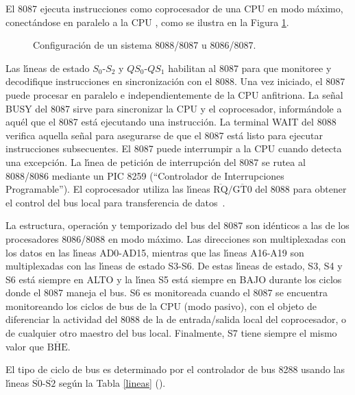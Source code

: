 El 8087 ejecuta instrucciones como coprocesador de una CPU en modo m\'aximo, conect\'andose en %
paralelo a la CPU \cite{Intel:Micro}, como se ilustra en la Figura \ref{fig:conexion}.

\vspace{5mm}

\begin{figure}[!htb]
\vskip 10mm
\vskip 80mm
\caption{Configuraci\'on de un sistema 8088/8087 u 8086/8087.}
\label{fig:conexion}
\end{figure}

Las l\'{\i}neas de estado $S_{0}$-$S_{2}$ y $QS_{0}$-$QS_{1}$ habilitan al 8087 para que %
mo\-ni\-to\-ree y decodifique instrucciones en sincronizaci\'on con el 8088. Una vez iniciado, %
el 8087 puede procesar en paralelo e independientemente de la CPU anfitriona. La se\~nal BUSY %
del 8087 sirve para sincronizar la CPU y el coprocesador, inform\'andole a aqu\'el que el 8087 %
est\'a ejecutando una instrucci\'on. La terminal WAIT del 8088 verifica aquella se\~nal para %
asegurarse de que el 8087 est\'a listo para ejecutar instrucciones subsecuentes. El 8087 puede %
interrumpir a la CPU cuando detecta una excepci\'on. La l\'{\i}nea de petici\'on de %
interrupci\'on del 8087 se rutea al 8088/8086 mediante un PIC 8259 (``Controlador de %
Interrupciones Programable''). El coprocesador utiliza las l\'{\i}neas %
$\overline{\mbox{RQ}}/\overline{\mbox{GT0}}$ del 8088 para obtener el control del bus %
local para transferencia de datos~\cite{Intel:Micro}.

La estructura, operaci\'on y temporizado del bus del 8087 son id\'enticos a las de los %
procesadores 8086/8088 en modo m\'aximo. Las direcciones son multiplexadas con los datos en las %
l\'{\i}neas AD0-AD15, mientras que las l\'{\i}neas A16-A19 son multiplexadas con las %
l\'{\i}neas de estado S3-S6. De estas l\'{\i}neas de estado, S3, S4 y S6 est\'a siempre en %
ALTO y la l\'{\i}nea S5 est\'a siempre en BAJO durante los ciclos donde el 8087 maneja el bus. %
S6 es monitoreada cuando el 8087 se encuentra monitoreando los ciclos de bus de la CPU (modo %
pasivo), con el objeto de diferenciar la actividad del 8088 de la de entrada/salida local del %
coprocesador, o de cualquier otro maestro del bus local. Finalmente, S7 tiene siempre el mismo %
valor que $\overline{\mbox{BHE}}$.

El tipo de ciclo de bus es determinado por el controlador de bus 8288 usando las l\'{\i}neas %
$\overline{\mbox{S0}}$-$\overline{\mbox{S2}}$ seg\'un la Tabla \ref{lineas} %
(\cite{Intel:Micro}).

